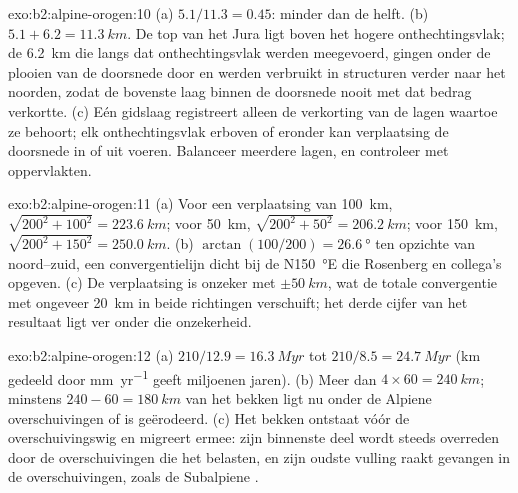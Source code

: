\begin{solution}{exo:b2:alpine-orogen:10}
(a) $5.1/11.3 = 0.45$: minder dan de helft. (b) $5.1 + 6.2 = \qty{11.3}{km}$. De top van het
Jura ligt boven het hogere onthechtingsvlak; de \qty{6.2}{km} die langs dat onthechtingsvlak werden meegevoerd,
gingen onder de plooien van de doorsnede door en werden verbruikt in structuren verder naar het noorden, zodat de
bovenste laag binnen de doorsnede nooit met dat bedrag verkortte. (c) Eén gidslaag registreert
alleen de verkorting van de lagen waartoe ze behoort; elk onthechtingsvlak erboven of eronder kan
verplaatsing de doorsnede in of uit voeren. Balanceer meerdere lagen, en controleer met oppervlakten.
\end{solution}

\begin{solution}{exo:b2:alpine-orogen:11}
(a) Voor een verplaatsing van \qty{100}{km}, $\sqrt{200^2 + 100^2} = \qty{223.6}{km}$; voor
\qty{50}{km}, $\sqrt{200^2 + 50^2} = \qty{206.2}{km}$; voor \qty{150}{km},
$\sqrt{200^2 + 150^2} = \qty{250.0}{km}$. (b) $\arctan(100/200) = \qty{26.6}{\degree}$ ten opzichte van
noord--zuid, een convergentielijn dicht bij de N\qty{150}{\degree}E die Rosenberg en
collega's opgeven. (c) De verplaatsing is onzeker met $\pm\qty{50}{km}$, wat de totale
convergentie met ongeveer \qty{20}{km} in beide richtingen verschuift; het derde cijfer van het resultaat ligt ver onder
die onzekerheid.
\end{solution}

\begin{solution}{exo:b2:alpine-orogen:12}
(a) $210/12.9 = \qty{16.3}{Myr}$ tot $210/8.5 = \qty{24.7}{Myr}$ (\unit{km} gedeeld door
\unit{mm.yr^{-1}} geeft miljoenen jaren). (b) Meer dan $4\times60 = \qty{240}{km}$; minstens
$240 - 60 = \qty{180}{km}$ van het bekken ligt nu onder de Alpiene overschuivingen of is
geërodeerd. (c) Het bekken ontstaat vóór de overschuivingswig en migreert ermee: zijn binnenste
deel wordt steeds overreden door de overschuivingen die het belasten, en zijn oudste vulling raakt gevangen
in de overschuivingen, zoals de Subalpiene .
\end{solution}

